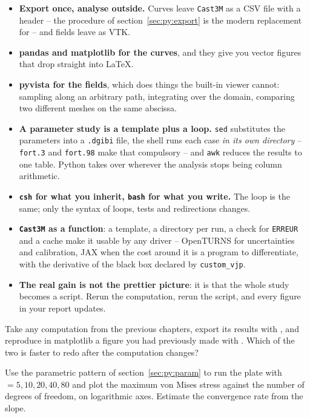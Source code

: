 \begin{gbox*}
\begin{itemize}
  \item \textbf{Export once, analyse outside.} Curves leave
  \texttt{Cast3M} as a CSV file with a header -- the 
  procedure of section~\ref{sec:py:export} is the modern replacement for
   -- and fields leave as VTK.
  \item \textbf{pandas and matplotlib for the curves}, and they give you
  vector figures that drop straight into \LaTeX{}.
  \item \textbf{pyvista for the fields}, which does things the built-in
  viewer cannot: sampling along an arbitrary path, integrating over the
  domain, comparing two different meshes on the same abscissa.
  \item \textbf{A parameter study is a template plus a loop.}
  \texttt{sed} substitutes the parameters into a \texttt{.dgibi} file, the
  shell runs each case \emph{in its own directory} -- \texttt{fort.3} and
  \texttt{fort.98} make that compulsory -- and \texttt{awk} reduces the
  results to one table. Python takes over wherever the analysis stops being
  column arithmetic.
  \item \textbf{\texttt{csh} for what you inherit, \texttt{bash} for what
  you write.} The loop is the same; only the syntax of loops, tests and
  redirections changes.
  \item \textbf{\texttt{Cast3M} as a function}: a template, a directory per
  run, a check for \texttt{ERREUR} and a cache make it usable by any driver --
  OpenTURNS for uncertainties and calibration, JAX when the cost around it is
  a program to differentiate, with the derivative of the black box declared by
  \texttt{custom\_vjp}.
  \item \textbf{The real gain is not the prettier picture}: it is that the
  whole study becomes a script. Rerun the computation, rerun the script, and
  every figure in your report updates.
\end{itemize}
\end{gbox*}


 Take any computation from the
  previous chapters, export its results with , and reproduce in
  matplotlib a figure you had previously made with . Which of the
  two is faster to redo after the computation changes?

 Use the parametric pattern of
  section~\ref{sec:py:param} to run the plate with  $=5,10,20,40,80$
  and plot the maximum von Mises stress against the number of degrees of
  freedom, on logarithmic axes. Estimate the convergence rate from the slope.

